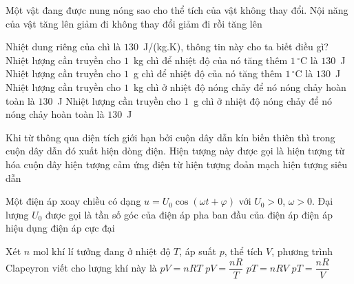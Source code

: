 	\begin{ex}%
		Một vật đang được nung nóng sao cho thể tích của vật không thay đổi. Nội năng của vật
		\choice
		{\True tăng lên}
		{giảm đi}
		{không thay đổi}
		{giảm đi rồi tăng lên}
	\end{ex}

	\begin{ex}%
		Nhiệt dung riêng của chì là $130$~J/(kg.K), thông tin này cho ta biết điều gì?
		\choice
		{\True Nhiệt lượng cần truyền cho $1$~kg chì để nhiệt độ của nó tăng thêm $1\,^\circ\text{C}$ là $130$~J}
		{Nhiệt lượng cần truyền cho $1$~g chì để nhiệt độ của nó tăng thêm $1\,^\circ\text{C}$ là $130$~J}
		{Nhiệt lượng cần truyền cho $1$~kg chì ở nhiệt độ nóng chảy để nó nóng chảy hoàn toàn là $130$~J}
		{Nhiệt lượng cần truyền cho $1$~g chì ở nhiệt độ nóng chảy để nó nóng chảy hoàn toàn là $130$~J}
	\end{ex}

	\begin{ex}%
		Khi từ thông qua diện tích giới hạn bởi cuộn dây dẫn kín biến thiên thì trong cuộn dây dẫn đó xuất hiện dòng điện. Hiện tượng này được gọi là
		\choice
		{hiện tượng từ hóa cuộn dây}
		{\True hiện tượng cảm ứng điện từ}
		{hiện tượng đoản mạch}
		{hiện tượng siêu dẫn}
	\end{ex}

	\begin{ex}%
		Một điện áp xoay chiều có dạng $u=U_0\cos(\omega t+\varphi)$ với $U_0>0$, $\omega>0$. Đại lượng $U_0$ được gọi là
		\choice
		{tần số góc của điện áp}
		{pha ban đầu của điện áp}
		{điện áp hiệu dụng}
		{\True điện áp cực đại}
	\end{ex}

	\begin{ex}%
		Xét $n$ mol khí lí tưởng đang ở nhiệt độ $T$, áp suất $p$, thể tích $V$, phương trình Clapeyron viết cho lượng khí này là
		\choice
		{\True $pV=nRT$}
		{$pV=\dfrac{nR}{T}$}
		{$pT=nRV$}
		{$pT=\dfrac{nR}{V}$}
	\end{ex}

